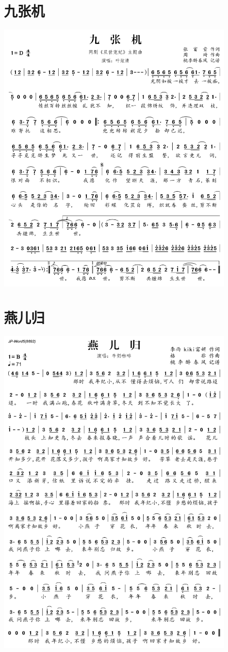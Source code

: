 \documentclass[cn,pad,twocol]{elegantbook}
\begin{document}
\section{九张机} \includegraphics[width=0.9\textwidth]{macos/2020九张机.png}
\section{燕儿归} \includegraphics[width=0.9\textwidth]{macos/2020燕儿归.png}
\end{document}
